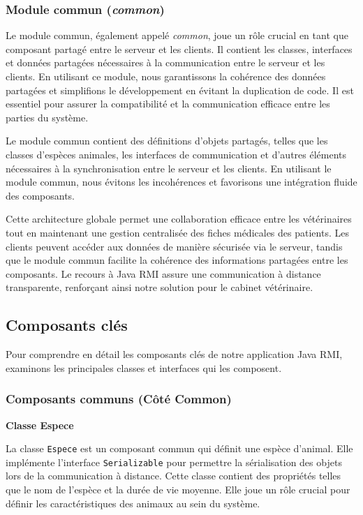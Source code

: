 \documentclass{article} %
\begin{document}
\subsubsection{Module commun (\textit{common})}

Le module commun, également appelé \textit{common}, joue un rôle crucial en tant que composant partagé entre le serveur et les clients. Il contient les classes, interfaces et données partagées nécessaires à la communication entre le serveur et les clients. En utilisant ce module, nous garantissons la cohérence des données partagées et simplifions le développement en évitant la duplication de code. Il est essentiel pour assurer la compatibilité et la communication efficace entre les parties du système.

Le module commun contient des définitions d'objets partagés, telles que les classes d'espèces animales, les interfaces de communication et d'autres éléments nécessaires à la synchronisation entre le serveur et les clients. En utilisant le module commun, nous évitons les incohérences et favorisons une intégration fluide des composants.

Cette architecture globale permet une collaboration efficace entre les vétérinaires tout en maintenant une gestion centralisée des fiches médicales des patients. Les clients peuvent accéder aux données de manière sécurisée via le serveur, tandis que le module commun facilite la cohérence des informations partagées entre les composants. Le recours à Java RMI assure une communication à distance transparente, renforçant ainsi notre solution pour le cabinet vétérinaire.


\subsection{Composants clés}

Pour comprendre en détail les composants clés de notre application Java RMI, examinons les principales classes et interfaces qui les composent.

\subsubsection{Composants communs (Côté Common)}

\textbf{Classe Espece}
\bigskip

La classe \texttt{Espece} est un composant commun qui définit une espèce d'animal. Elle implémente l'interface \texttt{Serializable} pour permettre la sérialisation des objets lors de la communication à distance. Cette classe contient des propriétés telles que le nom de l'espèce et la durée de vie moyenne. Elle joue un rôle crucial pour définir les caractéristiques des animaux au sein du système.
\end{document}
